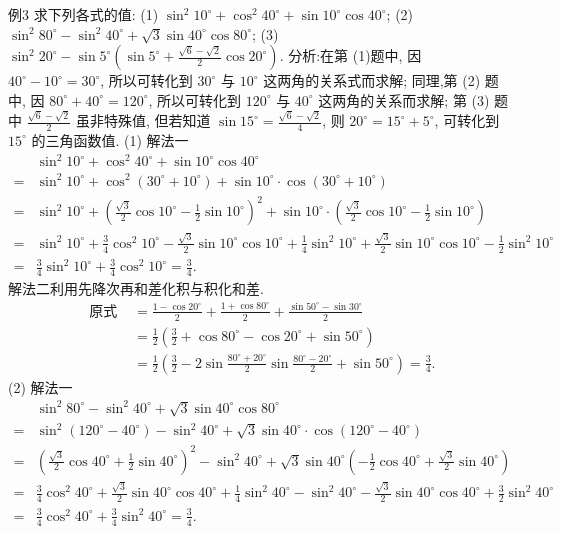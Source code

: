例3 求下列各式的值:
(1) $\sin ^2 10^{\circ}+\cos ^2 40^{\circ}+\sin 10^{\circ} \cos 40^{\circ}$;
(2) $\sin ^2 80^{\circ}-\sin ^2 40^{\circ}+\sqrt{3} \sin 40^{\circ} \cos 80^{\circ}$;
(3) $\sin ^2 20^{\circ}-\sin 5^{\circ}\left(\sin 5^{\circ}+\frac{\sqrt{6}-\sqrt{2}}{2} \cos 20^{\circ}\right)$.
分析:在第 (1)题中, 因 $40^{\circ}-10^{\circ}=30^{\circ}$, 所以可转化到 $30^{\circ}$ 与 $10^{\circ}$ 这两角的关系式而求解; 同理,第 (2) 题中, 因 $80^{\circ}+40^{\circ}=120^{\circ}$, 所以可转化到 $120^{\circ}$ 与 $40^{\circ}$ 这两角的关系而求解; 第 (3) 题中 $\frac{\sqrt{6}-\sqrt{2}}{2}$ 虽非特殊值, 但若知道 $\sin 15^{\circ}= \frac{\sqrt{6}-\sqrt{2}}{4}$, 则 $20^{\circ}=15^{\circ}+5^{\circ}$, 可转化到 $15^{\circ}$ 的三角函数值.
(1) 解法一
$$
\begin{aligned}
& \sin ^2 10^{\circ}+\cos ^2 40^{\circ}+\sin 10^{\circ} \cos 40^{\circ} \\
= & \sin ^2 10^{\circ}+\cos ^2\left(30^{\circ}+10^{\circ}\right)+\sin 10^{\circ} \cdot \cos \left(30^{\circ}+10^{\circ}\right) \\
= & \sin ^2 10^{\circ}+\left(\frac{\sqrt{3}}{2} \cos 10^{\circ}-\frac{1}{2} \sin 10^{\circ}\right)^2  +\sin 10^{\circ} \cdot\left(\frac{\sqrt{3}}{2} \cos 10^{\circ}-\frac{1}{2} \sin 10^{\circ}\right) \\
= & \sin ^2 10^{\circ}+\frac{3}{4} \cos ^2 10^{\circ}-\frac{\sqrt{3}}{2} \sin 10^{\circ} \cos 10^{\circ}+\frac{1}{4} \sin ^2 10^{\circ} +\frac{\sqrt{3}}{2} \sin 10^{\circ} \cos 10^{\circ}-\frac{1}{2} \sin ^2 10^{\circ} \\
= & \frac{3}{4} \sin ^2 10^{\circ}+\frac{3}{4} \cos ^2 10^{\circ}=\frac{3}{4} .
\end{aligned}
$$
解法二利用先降次再和差化积与积化和差.
$$
\begin{aligned}
\text { 原式 } & =\frac{1-\cos 20^{\circ}}{2}+\frac{1+\cos 80^{\circ}}{2}+\frac{\sin 50^{\circ}-\sin 30^{\circ}}{2} \\
& =\frac{1}{2}\left(\frac{3}{2}+\cos 80^{\circ}-\cos 20^{\circ}+\sin 50^{\circ}\right) \\
& =\frac{1}{2}\left(\frac{3}{2}-2 \sin \frac{80^{\circ}+20^{\circ}}{2} \sin \frac{80^{\circ}-20^{\circ}}{2}+\sin 50^{\circ}\right)=\frac{3}{4} .
\end{aligned}
$$
(2) 解法一
$$
\begin{aligned}
& \sin ^2 80^{\circ}-\sin ^2 40^{\circ}+\sqrt{3} \sin 40^{\circ} \cos 80^{\circ} \\
= & \sin ^2\left(120^{\circ}-40^{\circ}\right)-\sin ^2 40^{\circ}+\sqrt{3} \sin 40^{\circ} \cdot \cos \left(120^{\circ}-40^{\circ}\right) \\
= & \left(\frac{\sqrt{3}}{2} \cos 40^{\circ}+\frac{1}{2} \sin 40^{\circ}\right)^2-\sin ^2 40^{\circ} +\sqrt{3} \sin 40^{\circ}\left(-\frac{1}{2} \cos 40^{\circ}+\frac{\sqrt{3}}{2} \sin 40^{\circ}\right) \\
= & \frac{3}{4} \cos ^2 40^{\circ}+\frac{\sqrt{3}}{2} \sin 40^{\circ} \cos 40^{\circ}+\frac{1}{4} \sin ^2 40^{\circ} -\sin ^2 40^{\circ}-\frac{\sqrt{3}}{2} \sin 40^{\circ} \cos 40^{\circ}+\frac{3}{2} \sin ^2 40^{\circ} \\
= & \frac{3}{4} \cos ^2 40^{\circ}+\frac{3}{4} \sin ^2 40^{\circ}=\frac{3}{4} .
\end{aligned}
$$

